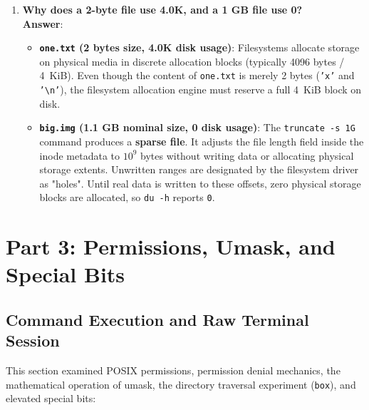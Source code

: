 \documentclass[12pt,a4paper]{article}
\begin{document}
\begin{enumerate}
    \item \textbf{Why does a 2-byte file use 4.0K, and a 1 GB file use 0?} \\
    \textbf{Answer}:
    \begin{itemize}
        \item \textbf{\texttt{one.txt} (2 bytes size, 4.0K disk usage)}: Filesystems allocate storage on physical media in discrete allocation blocks (typically 4096 bytes / 4~KiB). Even though the content of \texttt{one.txt} is merely 2 bytes (\texttt{'x'} and \texttt{'\textbackslash n'}), the filesystem allocation engine must reserve a full 4~KiB block on disk.
        \item \textbf{\texttt{big.img} (1.1 GB nominal size, 0 disk usage)}: The \texttt{truncate -s 1G} command produces a \textbf{sparse file}. It adjusts the file length field inside the inode metadata to $10^9$ bytes without writing data or allocating physical storage extents. Unwritten ranges are designated by the filesystem driver as "holes". Until real data is written to these offsets, zero physical storage blocks are allocated, so \texttt{du -h} reports \texttt{0}.
    \end{itemize}
\end{enumerate}

\newpage

\section{Part 3: Permissions, Umask, and Special Bits}

\subsection{Command Execution and Raw Terminal Session}
This section examined POSIX permissions, permission denial mechanics, the mathematical operation of umask, the directory traversal experiment (\texttt{box}), and elevated special bits:
\end{document}
